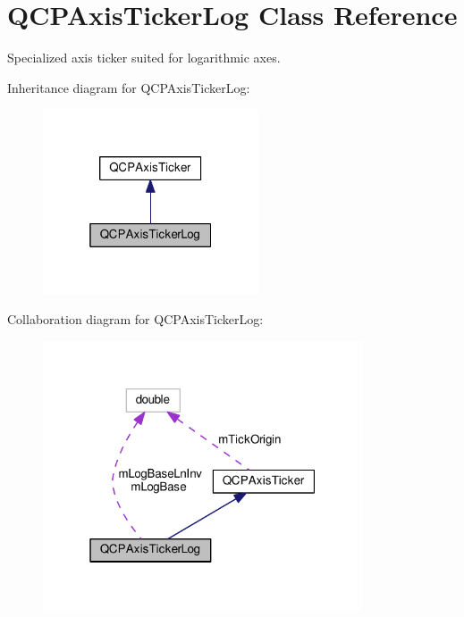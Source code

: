 \hypertarget{classQCPAxisTickerLog}{}\section{Q\+C\+P\+Axis\+Ticker\+Log Class Reference}
\label{classQCPAxisTickerLog}


Specialized axis ticker suited for logarithmic axes.  




Inheritance diagram for Q\+C\+P\+Axis\+Ticker\+Log\+:
\nopagebreak
\begin{figure}[H]
\begin{center}
\leavevmode
\includegraphics[width=181pt]{classQCPAxisTickerLog__inherit__graph}
\end{center}
\end{figure}


Collaboration diagram for Q\+C\+P\+Axis\+Ticker\+Log\+:
\nopagebreak
\begin{figure}[H]
\begin{center}
\leavevmode
\includegraphics[width=268pt]{classQCPAxisTickerLog__coll__graph}
\end{center}
\end{figure}
